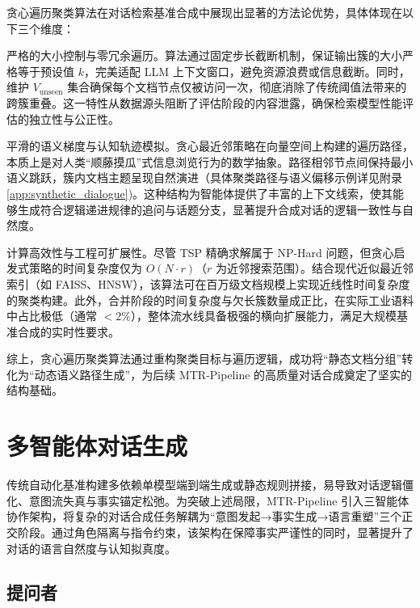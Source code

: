 贪心遍历聚类算法在对话检索基准合成中展现出显著的方法论优势，具体体现在以下三个维度：



严格的大小控制与零冗余遍历。算法通过固定步长截断机制，保证输出簇的大小严格等于预设值 $k$，完美适配 LLM 上下文窗口，避免资源浪费或信息截断。同时，维护 $V_{\text{unseen}}$ 集合确保每个文档节点仅被访问一次，彻底消除了传统阈值法带来的跨簇重叠。这一特性从数据源头阻断了评估阶段的内容泄露，确保检索模型性能评估的独立性与公正性。


平滑的语义梯度与认知轨迹模拟。贪心最近邻策略在向量空间上构建的遍历路径，本质上是对人类“顺藤摸瓜”式信息浏览行为的数学抽象。路径相邻节点间保持最小语义跳跃，簇内文档主题呈现自然演进（具体聚类路径与语义偏移示例详见附录\ref{app:synthetic_dialogue})。这种结构为智能体提供了丰富的上下文线索，使其能够生成符合逻辑递进规律的追问与话题分支，显著提升合成对话的逻辑一致性与自然度。



计算高效性与工程可扩展性。尽管 TSP 精确求解属于 NP-Hard 问题，但贪心启发式策略的时间复杂度仅为 $O(N \cdot r)$（$r$ 为近邻搜索范围）。结合现代近似最近邻索引（如 FAISS、HNSW），该算法可在百万级文档规模上实现近线性时间复杂度的聚类构建。此外，合并阶段的时间复杂度与欠长簇数量成正比，在实际工业语料中占比极低（通常 $<2\%$），整体流水线具备极强的横向扩展能力，满足大规模基准合成的实时性要求。



综上，贪心遍历聚类算法通过重构聚类目标与遍历逻辑，成功将“静态文档分组”转化为“动态语义路径生成”，为后续 MTR-Pipeline 的高质量对话合成奠定了坚实的结构基础。





\section{多智能体对话生成}

\label{sec:multi_agent_gen}



传统自动化基准构建多依赖单模型端到端生成或静态规则拼接，易导致对话逻辑僵化、意图流失真与事实锚定松弛。为突破上述局限，MTR-Pipeline 引入三智能体协作架构，将复杂的对话合成任务解耦为“意图发起→事实生成→语言重塑”三个正交阶段。通过角色隔离与指令约束，该架构在保障事实严谨性的同时，显著提升了对话的语言自然度与认知拟真度。



\subsection{提问者}



